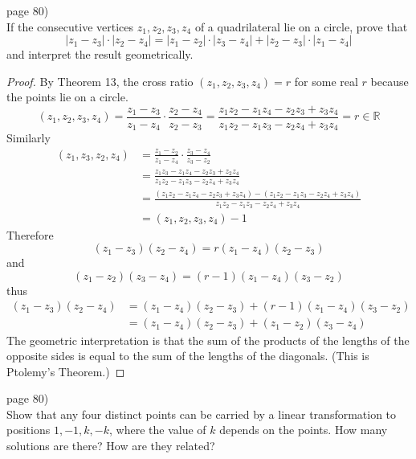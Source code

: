 \documentclass{article}
\newenvironment{problem}[2][Problem]{\begin{trivlist}
\item[\hskip \labelsep {\bfseries #1}\hskip \labelsep {\bfseries #2.}]}{\end{trivlist}}
\begin{document}
\pagebreak

\begin{problem}{3} (page 80) \\
  If the consecutive vertices $z_1, z_2, z_3, z_4$ of a quadrilateral lie on a
  circle, prove that \[
    |z_1 - z_3| \cdot |z_2 - z_4|
      = |z_1 - z_2| \cdot |z_3 - z_4|
      + |z_2 - z_3| \cdot |z_1 - z_4|
  \] and interpret the result geometrically.
\end{problem}

\begin{proof}
  By Theorem 13, the cross ratio $(z_1, z_2, z_3, z_4) = r$ for some real $r$ because the
  points lie on a circle. \[
    (z_1, z_2, z_3, z_4)
    = \frac{z_1 - z_3}{z_1 - z_4} \cdot \frac{z_2 - z_4}{z_2 - z_3}
    = \frac{z_1z_2 -z_1z_4 - z_2z_3 + z_3z_4}{z_1z_2 - z_1z_3 -z_2z_4 + z_3z_4}
    = r \in \mathbb{R}
  \] Similarly \begin{align*}
    (z_1, z_3, z_2, z_4)
    &= \frac{z_1 - z_2}{z_1 - z_4} \cdot \frac{z_3 - z_4}{z_3 - z_2} \\
    &= \frac{z_1z_3 -z_1z_4 - z_2z_3 + z_2z_4}{z_1z_2 - z_1z_3 -z_2z_4 + z_3z_4}\\
    &= \frac{(z_1z_2 -z_1z_4 - z_2z_3 + z_3z_4)-(z_1z_2 - z_1z_3 -z_2z_4 + z_3z_4)}{z_1z_2 - z_1z_3 -z_2z_4 + z_3z_4} \\
    &= (z_1, z_2, z_3, z_4) - 1
  \end{align*} Therefore \[
    (z_1 - z_3)(z_2 - z_4) = r(z_1 - z_4)(z_2 - z_3)
  \] and \[
    (z_1 - z_2)(z_3 - z_4) = (r - 1)(z_1 - z_4)(z_3 - z_2)
  \] thus \begin{align*}
    (z_1 - z_3)(z_2 - z_4) &= (z_1 - z_4)(z_2 - z_3) + (r - 1)(z_1 - z_4)(z_3 - z_2) \\
    &= (z_1 - z_4)(z_2 - z_3) + (z_1 - z_2)(z_3 - z_4)
  \end{align*}
  The geometric interpretation is that the sum of the products of the lengths of
  the opposite sides is equal to the sum of the lengths of the diagonals. (This is Ptolemy's Theorem.)
\end{proof}

\pagebreak

\begin{problem}{4} (page 80) \\
  Show that any four distinct points can be carried by a linear transformation
  to positions $1, -1, k, -k$, where the value of $k$ depends on the points.
  How many solutions are there? How are they related?
\end{problem}
\end{document}
